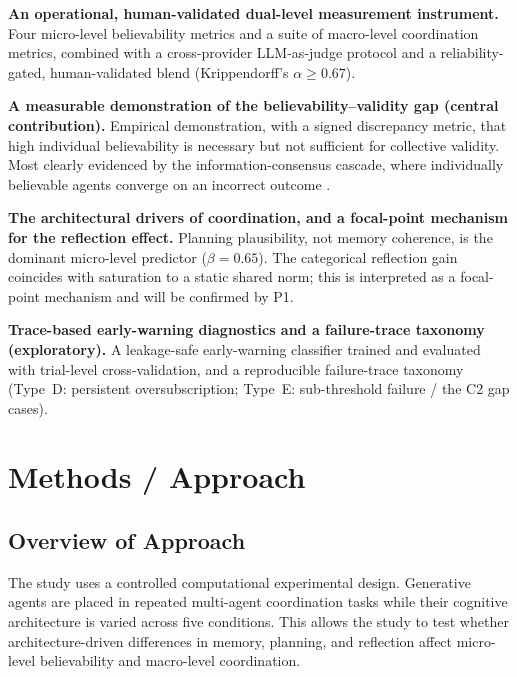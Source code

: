 \documentclass[11pt]{article}
\begin{document}
\begin{description}[leftmargin=1.4cm, style=nextline]
    \item[C1] \textbf{An operational, human-validated dual-level measurement instrument.} Four micro-level believability metrics and a suite of macro-level coordination metrics, combined with a cross-provider LLM-as-judge protocol \cite{zheng2023judging} and a reliability-gated, human-validated blend (Krippendorff's $\alpha \geq 0.67$).

    \item[C2] \textbf{A measurable demonstration of the believability--validity gap (central contribution).} Empirical demonstration, with a signed discrepancy metric, that high individual believability is necessary but not sufficient for collective validity. Most clearly evidenced by the information-consensus cascade, where individually believable agents converge on an incorrect outcome \cite{bikhchandani1992theory}.

    \item[C3] \textbf{The architectural drivers of coordination, and a focal-point mechanism for the reflection effect.} Planning plausibility, not memory coherence, is the dominant micro-level predictor ($\beta = 0.65$). The categorical reflection gain coincides with saturation to a static shared norm; this is interpreted as a focal-point mechanism and will be confirmed by P1.

    \item[C4] \textbf{Trace-based early-warning diagnostics and a failure-trace taxonomy (exploratory).} A leakage-safe early-warning classifier trained and evaluated with trial-level cross-validation, and a reproducible failure-trace taxonomy (Type~D: persistent oversubscription; Type~E: sub-threshold failure / the C2 gap cases).
\end{description}

\section{Methods / Approach}

\subsection{Overview of Approach}
The study uses a controlled computational experimental design. Generative agents are placed in repeated multi-agent coordination tasks while their cognitive architecture is varied across five conditions. This allows the study to test whether architecture-driven differences in memory, planning, and reflection affect micro-level believability and macro-level coordination.
\end{document}
